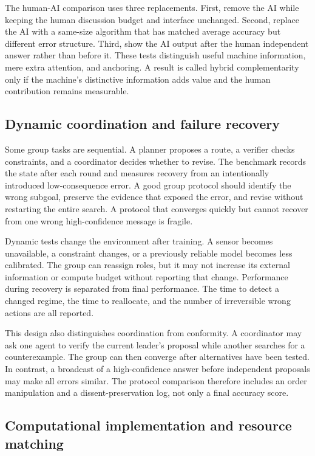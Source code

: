 \documentclass[conference]{IEEEtran}
\begin{document}
The human-AI comparison uses three replacements. First, remove the AI while keeping the human discussion budget and interface unchanged. Second, replace the AI with a same-size algorithm that has matched average accuracy but different error structure. Third, show the AI output after the human independent answer rather than before it. These tests distinguish useful machine information, mere extra attention, and anchoring. A result is called hybrid complementarity only if the machine's distinctive information adds value and the human contribution remains measurable.

\subsection{Dynamic coordination and failure recovery}

Some group tasks are sequential. A planner proposes a route, a verifier checks constraints, and a coordinator decides whether to revise. The benchmark records the state after each round and measures recovery from an intentionally introduced low-consequence error. A good group protocol should identify the wrong subgoal, preserve the evidence that exposed the error, and revise without restarting the entire search. A protocol that converges quickly but cannot recover from one wrong high-confidence message is fragile.

Dynamic tests change the environment after training. A sensor becomes unavailable, a constraint changes, or a previously reliable model becomes less calibrated. The group can reassign roles, but it may not increase its external information or compute budget without reporting that change. Performance during recovery is separated from final performance. The time to detect a changed regime, the time to reallocate, and the number of irreversible wrong actions are all reported.

This design also distinguishes coordination from conformity. A coordinator may ask one agent to verify the current leader's proposal while another searches for a counterexample. The group can then converge after alternatives have been tested. In contrast, a broadcast of a high-confidence answer before independent proposals may make all errors similar. The protocol comparison therefore includes an order manipulation and a dissent-preservation log, not only a final accuracy score.

\subsection{Computational implementation and resource matching}
\end{document}
